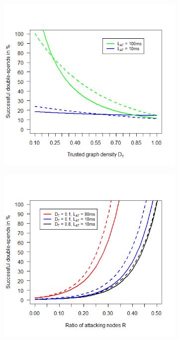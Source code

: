 \documentclass[a4paper,12pt,twoside]{report}
\begin{document}
\begin{figure}
\centering
\begin{subfigure}{.495\textwidth}
  \centering
  \includegraphics[width=\linewidth]{Comparison/TruDensity/trudens.png}
\end{subfigure}
\begin{subfigure}{.495\textwidth}
  \centering
  \includegraphics[width=\linewidth]{Comparison/TruDensity/trudensrat.png}

\end{subfigure}
\end{figure}
\end{document}
